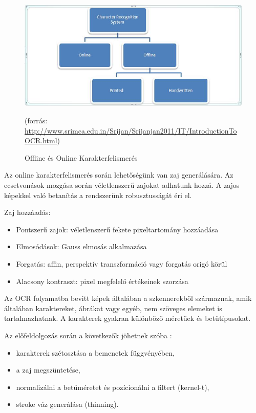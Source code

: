 \begin{figure}[h]
\centering
\includegraphics[scale=0.75]{images/ocr_online_offline}
\caption{Offline és Online Karakterfelismerés}
(forrás: \url{http://www.srimca.edu.in/Srijan/Srijanjan2011/IT/IntroductionToOCR.html})
\end{figure}

Az online karakterfelismerés során lehetőségünk van zaj generálására. Az ecsetvonások mozgása során véletlenszerű zajokat adhatunk hozzá. A zajos képekkel való betanítás a rendszerünk robusztusságát éri el.

Zaj hozzáadás:
\begin{itemize}
\item Pontszerű zajok: véletlenszerű fekete pixeltartomány hozzáadása
\item Elmosódások: Gauss elmosás alkalmazása
\item Forgatás: affin, perspektív transzformáció vagy forgatás origó körül 
\item Alacsony kontraszt: pixel megfelelő értékeinek szorzása
\end{itemize}

Az OCR folyamatba bevitt képek általában a szkennerekből származnak, amik általában karaktereket, ábrákat vagy egyéb, nem szöveges elemeket is tartalmazhatnak. A karakterek gyakran különböző méretűek és betűtípusokat.

Az előfeldolgozás során a következők jöhetnek szóba \cite{zhou2017stroke}: 
\begin{itemize}
\item karakterek szétosztása a bemenetek függvényében,
\item a zaj megszüntetése,
\item normalizálni a betűméretet és pozícionálni a filtert (kernel-t),
\item stroke váz generálása (thinning).
\end{itemize}

